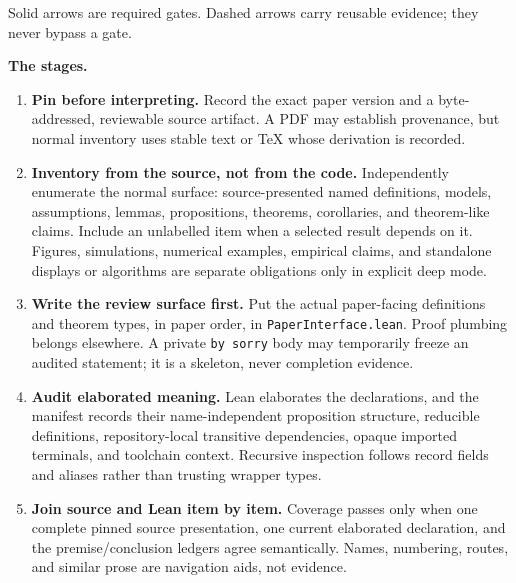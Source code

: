 \documentclass[10pt]{article}
\newcommand{\Lean}{Lean}
\newcommand{\file}[1]{\texttt{#1}}
\begin{document}
\begin{center}

{\footnotesize Solid arrows are required gates. Dashed arrows carry reusable evidence; they never bypass a gate.}
\end{center}

\textbf{The stages.}
\begin{enumerate}
  \item \textbf{Pin before interpreting.} Record the exact paper version and a
  byte-addressed, reviewable source artifact. A PDF may establish provenance,
  but normal inventory uses stable text or \TeX{} whose derivation is recorded.

  \item \textbf{Inventory from the source, not from the code.} Independently
  enumerate the normal surface: source-presented named definitions, models,
  assumptions, lemmas, propositions, theorems, corollaries, and theorem-like
  claims. Include an unlabelled item when a selected result depends on it.
  Figures, simulations, numerical examples, empirical claims, and standalone
  displays or algorithms are separate obligations only in explicit deep mode.

  \item \textbf{Write the review surface first.} Put the actual paper-facing
  definitions and theorem types, in paper order, in
  \file{PaperInterface.lean}. Proof plumbing belongs elsewhere. A private
  \file{by sorry} body may temporarily freeze an audited statement; it is a
  skeleton, never completion evidence.

  \item \textbf{Audit elaborated meaning.} \Lean{} elaborates the declarations,
  and the manifest records their name-independent proposition structure,
  reducible definitions, repository-local transitive dependencies, opaque
  imported terminals, and toolchain context. Recursive inspection follows
  record fields and aliases rather than trusting wrapper types.

  \item \textbf{Join source and \Lean{} item by item.} Coverage passes only when
  one complete pinned source presentation, one current elaborated declaration,
  and the premise/conclusion ledgers agree semantically. Names, numbering,
  routes, and similar prose are navigation aids, not evidence.


\end{enumerate}
\end{document}
